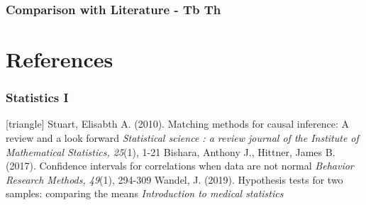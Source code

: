 \documentclass[xcolor=table]{beamer}
\begin{document}
\begin{frame}
	\frametitle{Comparison with Literature - Tb Th}
	\begin{table}[h!]
		\centering
	\end{table}
\end{frame}


\appendix

\section{References}
\begin{frame}
	\frametitle{Statistics I}
	\footnotesize{
		\begin{thebibliography}{99}
			[triangle]
			 Stuart, Elisabth A. (2010).
			\newblock Matching methods for causal inference: A review and a look forward
			\newblock \textit{Statistical science : a review journal of the Institute of Mathematical Statistics, 25}(1), 1-21
			\vspace{1mm}
			 Bishara, Anthony J., Hittner, James B. (2017).
			\newblock Confidence intervals for correlations when data are not normal
			\newblock \textit{Behavior Research Methods, 49}(1), 294-309
			\vspace{1mm}
			 Wandel, J. (2019).
			\newblock Hypothesis tests for two samples: comparing the means
			\newblock \textit{Introduction to medical statistics}
		\end{thebibliography}
	}
\end{frame}
\end{document}

